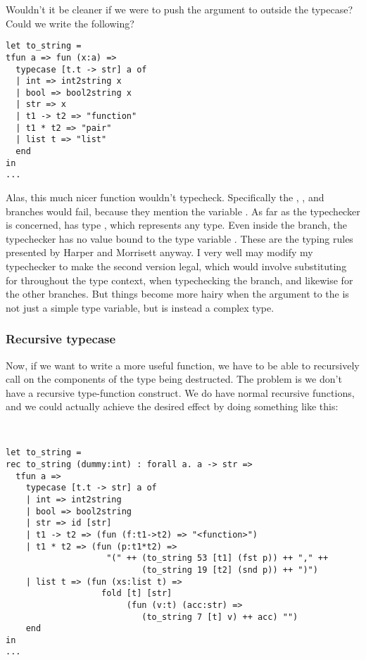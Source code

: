 \documentclass[pageno]{jpaper}
\begin{document}
{{{%

Wouldn't it be cleaner if we were to push the argument to  outside the typecase?
Could we write the following?

\begin{lstlisting}[mathescape]
let to_string = 
tfun a => fun (x:a) =>
  typecase [t.t -> str] a of
  | int => int2string x
  | bool => bool2string x
  | str => x
  | t1 -> t2 => "function"
  | t1 * t2 => "pair"
  | list t => "list"
  end
in
...
\end{lstlisting}

Alas, this much nicer function wouldn't typecheck. Specifically the , ,
and  branches would fail, because they mention the variable . As far as the typechecker is concerned,  has type , which represents any type. Even inside the  branch,
the typechecker has no value bound to the type variable . These are the typing rules presented by
Harper and Morrisett anyway. I very well may modify my typechecker to make the second version legal,
which would involve substituting  for  throughout the type context, when typechecking
the  branch, and likewise for the other branches. But things become more hairy when
the argument to the  is not just a simple type variable, but is instead a complex
type. 

\subsubsection{Recursive typecase}

Now, if we want to write a more useful  function, we have to be able to recursively call
 on the components of the type being destructed.
The problem is we don't have a recursive type-function construct. We do have normal recursive functions,
and we could actually achieve the desired effect by doing something like this:

\begin{lstlisting}[mathescape]


let to_string =
rec to_string (dummy:int) : forall a. a -> str =>
  tfun a =>
    typecase [t.t -> str] a of
    | int => int2string
    | bool => bool2string
    | str => id [str]
    | t1 -> t2 => (fun (f:t1->t2) => "<function>")
    | t1 * t2 => (fun (p:t1*t2) => 
                    "(" ++ (to_string 53 [t1] (fst p)) ++ "," ++
                           (to_string 19 [t2] (snd p)) ++ ")")
    | list t => (fun (xs:list t) =>
                   fold [t] [str] 
                        (fun (v:t) (acc:str) =>
                           (to_string 7 [t] v) ++ acc) "")
    end
in
...
\end{lstlisting}

}}}
\end{document}
